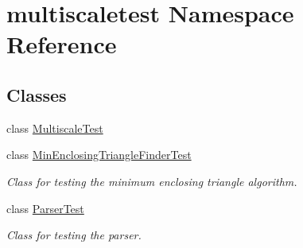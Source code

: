 \hypertarget{namespacemultiscaletest}{\section{multiscaletest \-Namespace \-Reference}
\label{namespacemultiscaletest}
}
\subsection*{\-Classes}
\begin{DoxyCompactItemize}
\item 
class \hyperlink{classmultiscaletest_1_1MultiscaleTest}{\-Multiscale\-Test}
\item 
class \hyperlink{classmultiscaletest_1_1MinEnclosingTriangleFinderTest}{\-Min\-Enclosing\-Triangle\-Finder\-Test}
\begin{DoxyCompactList}\small\item\em \-Class for testing the minimum enclosing triangle algorithm. \end{DoxyCompactList}\item 
class \hyperlink{classmultiscaletest_1_1ParserTest}{\-Parser\-Test}
\begin{DoxyCompactList}\small\item\em \-Class for testing the parser. \end{DoxyCompactList}\end{DoxyCompactItemize}
